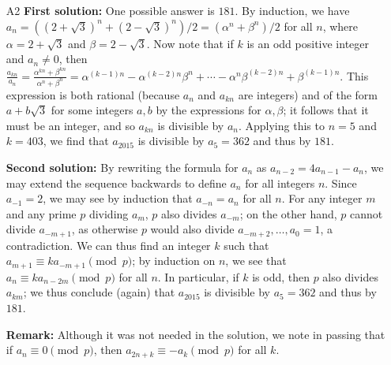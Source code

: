 \documentclass[amssymb,twocolumn,pra,10pt,aps]{revtex4-1}
\begin{document}
\begin{itemize}
\item[A2]
\noindent
\textbf{First solution:}
One possible answer is $181$.
By induction, we have $a_n = ((2+\sqrt{3})^n+(2-\sqrt{3})^n)/2 = (\alpha^n+\beta^n)/2$ for all $n$, where $\alpha = 2+\sqrt{3}$ and $\beta = 2-\sqrt{3}$. Now note that if $k$ is an odd positive integer and $a_n \neq 0$, then
$\frac{a_{kn}}{a_n} = \frac{\alpha^{kn}+\beta^{kn}}{\alpha^n+\beta^n}
= \alpha^{(k-1)n}-\alpha^{(k-2)n}\beta^n+\cdots-\alpha^n\beta^{(k-2)n}+\beta^{(k-1)n}$.
This expression is both rational (because $a_n$ and $a_{kn}$ are integers) and of the form $a+b\sqrt{3}$ for some integers $a,b$ by the expressions for $\alpha,\beta$; it follows that it must be an integer, and so $a_{kn}$ is divisible by $a_n$. Applying this to $n=5$ and $k=403$, we find that $a_{2015}$ is divisible by $a_5 = 362$ and thus by $181$.

\noindent
\textbf{Second solution:}
By rewriting the formula for $a_n$ as $a_{n-2} = 4a_{n-1} - a_n$, we may extend the sequence backwards to define $a_n$ for all integers $n$. Since $a_{-1} = 2$, we may see by induction that $a_{-n} = a_n$ for all $n$. For any integer $m$ and any prime $p$ dividing $a_m$,
$p$ also divides $a_{-m}$; on the other hand, $p$ cannot divide $a_{-m+1}$, as otherwise $p$ would also divide $a_{-m+2}, \dots, a_0 = 1$, a contradiction. We can thus find an integer $k$ such that $a_{m+1} \equiv k a_{-m+1} \pmod{p}$; by induction on $n$, we see that
$a_n \equiv k a_{n-2m} \pmod{p}$ for all $n$. In particular, if $k$ is odd, then $p$ also divides $a_{km}$; we thus conclude (again) that $a_{2015}$ is divisible by $a_5 = 362$ and thus by $181$.

\noindent
\textbf{Remark:}
Although it was not needed in the solution, we note in passing that if $a_n \equiv 0 \pmod{p}$, then $a_{2n+k} \equiv -a_{k} \pmod{p}$ for all $k$.


\end{itemize}
\end{document}
